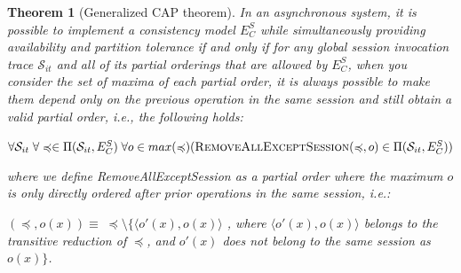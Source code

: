 \documentclass[journal,compsoc]{IEEEtran}
\newtheorem{theorem}{Theorem}[section]
\begin{document}
\begin{theorem}[Generalized CAP theorem]
In an asynchronous system, it is possible to implement a consistency model $E^S_C$ while simultaneously providing availability and partition tolerance if and only if for any global session invocation trace $\mathcal{S}_{it}$ and all of its partial orderings that are allowed by $E^S_C$, when you consider the set of maxima of each partial order, it is always possible to make them depend only on the previous operation in the same session and still obtain a valid partial order, i.e., the following holds:


 $\forall \mathcal{S}_{it} \; \forall \preccurlyeq \in \Pi(\mathcal{S}_{it},E^S_C) \; \forall o \in max(\preccurlyeq) \\ (\textsc{RemoveAllExceptSession}(\preccurlyeq,o) \in \Pi(\mathcal{S}_{it},E^S_C) ) $

where we define {\sc RemoveAllExceptSession} as a partial order where the maximum $o$ is only directly ordered after prior operations in the same session, i.e.:

$(\preccurlyeq,o(x)) \equiv \; \preccurlyeq \setminus \{ \langle o'(x),o(x) \rangle$ , where $\langle o'(x),o(x) \rangle$ belongs to the transitive reduction of $\preccurlyeq$, and $o'(x)$ does not belong to the same session as $o(x)\}$.



 \end{theorem} \label{thrm:cap}
\end{document}
